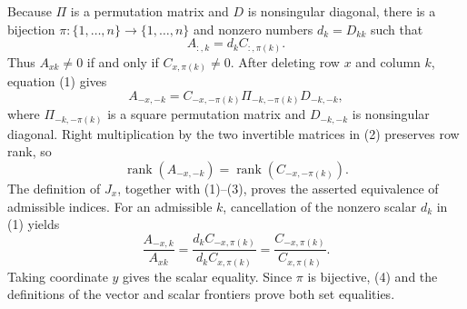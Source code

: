 Because \(\Pi\) is a permutation matrix and \(D\) is nonsingular diagonal, there is a bijection \(\pi:\{1,\ldots,n\}\to\{1,\ldots,n\}\) and nonzero numbers \(d_k=D_{kk}\) such that
\[
 A_{:,k}=d_k C_{:,\pi(k)}. \tag{1}
\]
Thus \(A_{xk}\ne0\) if and only if \(C_{x,\pi(k)}\ne0\). After deleting row \(x\) and column \(k\), equation (1) gives
\[
 A_{-x,-k}=C_{-x,-\pi(k)}\Pi_{-k,-\pi(k)}D_{-k,-k}, \tag{2}
\]
where \(\Pi_{-k,-\pi(k)}\) is a square permutation matrix and \(D_{-k,-k}\) is nonsingular diagonal. Right multiplication by the two invertible matrices in (2) preserves row rank, so
\[
 \operatorname{rank}(A_{-x,-k})
 =\operatorname{rank}(C_{-x,-\pi(k)}). \tag{3}
\]
The definition of \(J_x\), together with (1)--(3), proves the asserted equivalence of admissible indices. For an admissible \(k\), cancellation of the nonzero scalar \(d_k\) in (1) yields
\[
 \frac{A_{-x,k}}{A_{xk}}
 =\frac{d_kC_{-x,\pi(k)}}{d_kC_{x,\pi(k)}}
 =\frac{C_{-x,\pi(k)}}{C_{x,\pi(k)}}. \tag{4}
\]
Taking coordinate \(y\) gives the scalar equality. Since \(\pi\) is bijective, (4) and the definitions of the vector and scalar frontiers prove both set equalities.